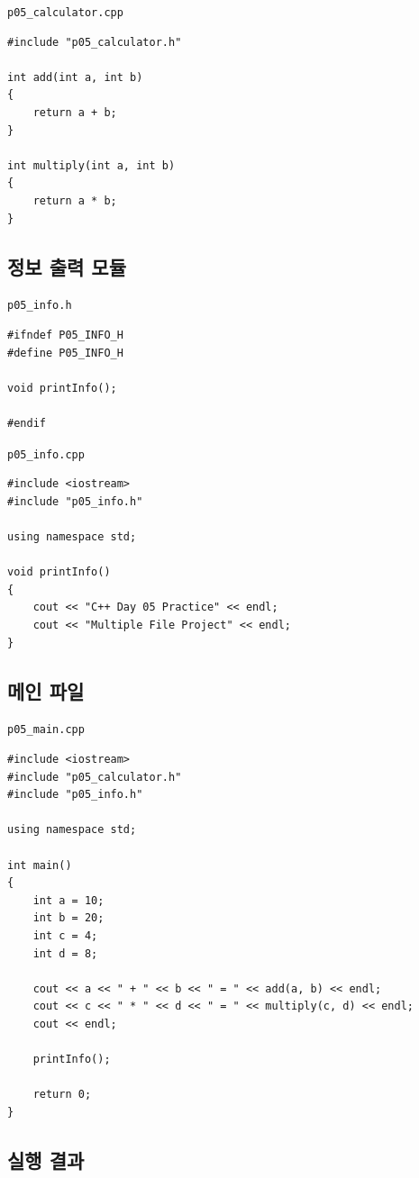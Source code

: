 \documentclass[11pt,a4paper]{article}
\begin{document}
\texttt{p05\_calculator.cpp}

\begin{lstlisting}
#include "p05_calculator.h"

int add(int a, int b)
{
    return a + b;
}

int multiply(int a, int b)
{
    return a * b;
}
\end{lstlisting}

\subsection{정보 출력 모듈}

\texttt{p05\_info.h}

\begin{lstlisting}
#ifndef P05_INFO_H
#define P05_INFO_H

void printInfo();

#endif
\end{lstlisting}

\texttt{p05\_info.cpp}

\begin{lstlisting}
#include <iostream>
#include "p05_info.h"

using namespace std;

void printInfo()
{
    cout << "C++ Day 05 Practice" << endl;
    cout << "Multiple File Project" << endl;
}
\end{lstlisting}

\subsection{메인 파일}

\texttt{p05\_main.cpp}

\begin{lstlisting}
#include <iostream>
#include "p05_calculator.h"
#include "p05_info.h"

using namespace std;

int main()
{
    int a = 10;
    int b = 20;
    int c = 4;
    int d = 8;

    cout << a << " + " << b << " = " << add(a, b) << endl;
    cout << c << " * " << d << " = " << multiply(c, d) << endl;
    cout << endl;

    printInfo();

    return 0;
}
\end{lstlisting}

\subsection{실행 결과}
\end{document}
